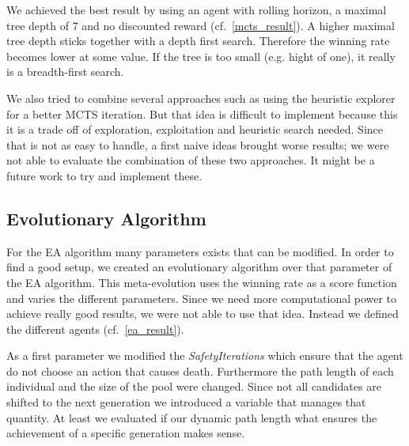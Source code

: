 We achieved the best result by using an agent with rolling horizon, a maximal tree depth of 7 
and no discounted reward (cf.~\cref{mcts_result}). 
A higher maximal tree depth sticks together with a depth first search. Therefore the winning rate
becomes lower at some value. If the tree is too small (e.g. hight of one), it really is a breadth-first search.

We also tried to combine several approaches such as using the heuristic explorer 
for a better \ac{MCTS} iteration. But that idea is difficult to implement because this
it is a trade off of exploration, exploitation and heuristic search needed. Since that is
not as easy to handle, a first naive ideas brought worse results; we were not able to evaluate the combination of these two approaches.
It might be a future work to try and implement these.



\subsection{Evolutionary Algorithm} 

For the \ac{EA} algorithm many parameters exists that can be modified. In order to find a
good setup, we created an evolutionary algorithm over that parameter of the \ac{EA}
algorithm. This meta-evolution uses the winning rate as a score function and
varies the different parameters. Since we need more computational power to
achieve really good results, we were not able to use that idea. Instead we defined
the different agents (cf.~\cref{ea_result}).

As a first parameter we modified the \textit{SafetyIterations} which ensure that the agent do not
choose an action that causes death.
Furthermore the path length of each individual and the size of the pool were changed.
Since not all candidates are shifted to the next generation we introduced a variable
that manages that quantity. At least we evaluated if our dynamic path length what
ensures the achievement of a specific generation makes sense.


